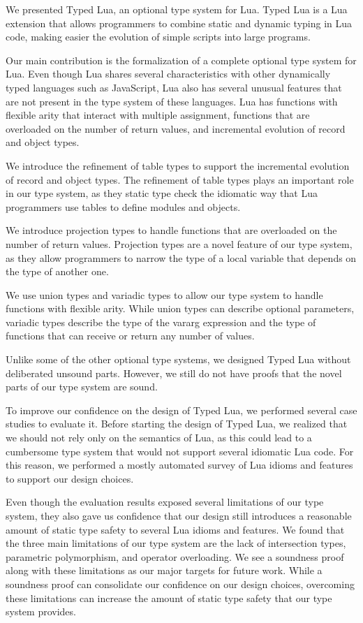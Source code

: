 We presented Typed Lua, an optional type system for Lua.
Typed Lua is a Lua extension that allows programmers to combine static
and dynamic typing in Lua code, making easier the evolution of simple scripts
into large programs.

Our main contribution is the formalization of a complete optional
type system for Lua.
Even though Lua shares several characteristics with other dynamically
typed languages such as JavaScript, Lua also has several unusual features
that are not present in the type system of these languages.
Lua has functions with flexible arity that interact with multiple
assignment, functions that are overloaded on the number of return values,
and incremental evolution of record and object types.

We introduce the refinement of table types to support the incremental
evolution of record and object types.
The refinement of table types plays an important role in our type
system, as they static type check the idiomatic way that Lua programmers
use tables to define modules and objects.

We introduce projection types to handle functions that are overloaded
on the number of return values.
Projection types are a novel feature of our type system, as they
allow programmers to narrow the type of a local variable that depends
on the type of another one.

We use union types and variadic types to allow our type system to
handle functions with flexible arity.
While union types can describe optional parameters, variadic types
describe the type of the vararg expression and the type of functions
that can receive or return any number of values.

Unlike some of the other optional type systems, we designed Typed Lua
without deliberated unsound parts.
However, we still do not have proofs that the novel parts of our type
system are sound.

To improve our confidence on the design of Typed Lua, we performed several
case studies to evaluate it.
Before starting the design of Typed Lua, we realized that we should
not rely only on the semantics of Lua, as this could lead to a
cumbersome type system that would not support several idiomatic Lua code.
For this reason, we performed a mostly automated survey of Lua idioms
and features to support our design choices.

Even though the evaluation results exposed several limitations of our
type system, they also gave us confidence that our design still
introduces a reasonable amount of static type safety to several Lua idioms
and features.
We found that the three main limitations of our type system are
the lack of intersection types, parametric polymorphism, and operator overloading.
We see a soundness proof along with these limitations as our major targets
for future work.
While a soundness proof can consolidate our confidence on our design choices,
overcoming these limitations can increase the amount of static type safety
that our type system provides.

